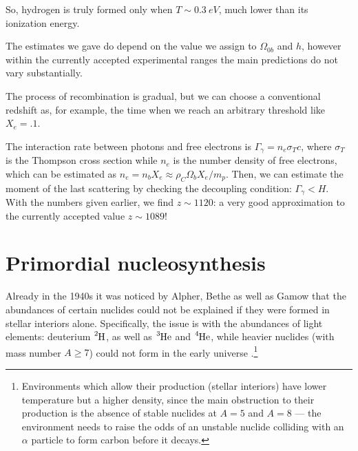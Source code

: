 \documentclass[main.tex]{subfiles}
\begin{document}
So, hydrogen is truly formed only when \(T \sim \SI{0.3}{eV}\), much lower than its ionization energy.


The estimates we gave do depend on the value we assign to \(\Omega_{0b}\) and \(h\), however within the currently accepted experimental ranges the main predictions do not vary substantially. 

The process of recombination is gradual, but we can choose a conventional redshift as, for example, the time when we reach an arbitrary threshold like \(X_e = \num{.1}\). 

The interaction rate between photons and free electrons is \(\Gamma_{\gamma } = n_e \sigma_T c\), where \(\sigma _T\) is the Thompson cross section while \(n_e\) is the number density of free electrons, which can be estimated as \(n_e = n_b X_e \approx \rho_C \Omega_{b} X_e / m_p\). 
Then, we can estimate the moment of the last scattering by checking the decoupling condition: \(\Gamma _\gamma < H\). 
With the numbers given earlier, we find \(z \sim 1120\): a very good approximation to the currently accepted value \(z \sim 1089\)!




\section{Primordial nucleosynthesis}

Already in the 1940s it was noticed by Alpher, Bethe as well as Gamow that the abundances of certain nuclides could not be explained if they were formed in stellar interiors alone. 
Specifically, the issue is with the abundances of light elements: deuterium \(\ce{^{2}H}\), as well as \(\ce{^{3}He}\) and \(\ce{^{4}He}\), while heavier nuclides (with mass number \(A \geq 7\)) could not form in the early universe \cite[sec.\ 8.6.1]{colespCosmology2002}.\footnote{Environments which allow their production (stellar interiors) have lower temperature but a higher density, since the main obstruction to their production is the absence of stable nuclides at \(A = 5\) and \(A= 8\) --- the environment needs to raise the odds of an unstable  nuclide colliding with an \(\alpha \) particle to form carbon before it decays.}
\end{document}
